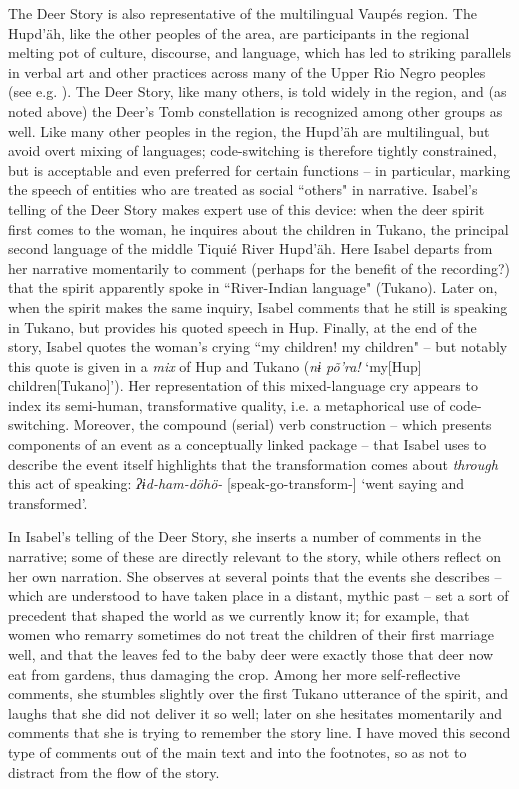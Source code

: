 \documentclass[output=paper,
modfonts,nonflat
]{langsci/langscibook}
\begin{document}
	The Deer Story is also representative of the multilingual Vaupés region. The Hupd’äh, like the other peoples of the area, are participants in the regional melting pot of culture, discourse, and language, which has led to striking parallels in verbal art and other practices across many of the Upper Rio Negro peoples (see e.g. \citealt{EppsandStenzel2013}). The Deer Story, like many others, is told widely in the region, and (as noted above) the Deer’s Tomb constellation is recognized among other groups as well. Like many other peoples in the region, the Hupd’äh are multilingual, but avoid overt mixing of languages; code-switching is therefore tightly constrained, but is acceptable and even preferred for certain functions – in particular, marking the speech of entities who are treated as social “others" in narrative. Isabel’s telling of the Deer Story makes expert use of this device: when the deer spirit first comes to the woman, he inquires about the children in Tukano, the principal second language of the middle Tiquié River Hupd’äh. Here Isabel departs from her narrative momentarily to comment (perhaps for the benefit of the recording?) that the spirit apparently spoke in “River-Indian language" (Tukano). Later on, when the spirit makes the same inquiry, Isabel comments that he still is speaking in Tukano, but provides his quoted speech in Hup. Finally, at the end of the story, Isabel quotes the woman’s crying “my children! my children" – but notably this quote is given in a \textit{mix} of Hup and Tukano (\textit{nɨ põ’ra!} ‘my[Hup] children[Tukano]’). Her representation of this mixed-language cry appears to index its semi-human, transformative quality, i.e. a metaphorical use of code-switching. Moreover, the compound (serial) verb construction – which presents components of an event as a conceptually linked package – that Isabel uses to describe the event itself highlights that the transformation comes about \textit{through} this act of speaking: \textit{ʔɨd-ham-döhö-} [speak-go-transform-] ‘went saying and transformed’.
    
	In Isabel’s telling of the Deer Story, she inserts a number of comments in the narrative; some of these are directly relevant to the story, while others reflect on her own narration. She observes at several points that the events she describes – which are understood to have taken place in a distant, mythic past – set a sort of precedent that shaped the world as we currently know it; for example, that women who remarry sometimes do not treat the children of their first marriage well, and that the leaves fed to the baby deer were exactly those that deer now eat from gardens, thus damaging the crop. Among her more self-reflective comments, she stumbles slightly over the first Tukano utterance of the spirit, and laughs that she did not deliver it so well; later on she hesitates momentarily and comments that she is trying to remember the story line. I have moved this second type of comments out of the main text and into the footnotes, so as not to distract from the flow of the story.
    
\end{document}
